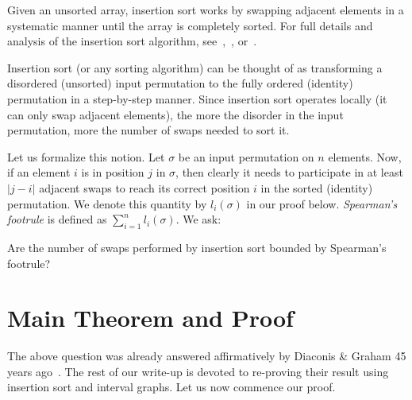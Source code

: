 \documentclass[12pt]{article}
\begin{document}
	Given an unsorted array, insertion sort works by swapping adjacent elements in a systematic manner until the array is completely sorted. For full details and analysis of the insertion sort algorithm, see~\cite[Page 80]{knuth1998},~\cite[Page 16]{cormen2022}, or~\cite{enwiki:ainsertionsort}.
	
	Insertion sort (or any sorting algorithm) can be thought of as transforming a disordered (unsorted) input permutation to the fully ordered (identity) permutation in a step-by-step manner. Since insertion sort operates locally (it can only swap adjacent elements), the more the disorder in the input permutation, more the number of swaps needed to sort it.
	
	Let us formalize this notion. Let $\sigma$ be an input permutation on $n$ elements. Now, if an element $i$ is in position $j$ in $\sigma$, then clearly it needs to participate in at least $|j-i|$ adjacent swaps to reach its correct position $i$ in the sorted (identity) permutation. We denote this quantity by $l_i(\sigma)$ in our proof below. \emph{Spearman's footrule} is defined as $\sum_{i=1}^n l_i(\sigma)$. We ask: %
	
	
	\vspace{0.3cm}
	\begin{mdframed}[backgroundcolor=blue!5]
	\begin{itshape} Are the number of swaps performed by insertion sort bounded by Spearman's footrule?
	\end{itshape}
	\end{mdframed}
	
	\section{Main Theorem and Proof}
	
	The above question was already answered affirmatively by Diaconis \& Graham 45 years ago~\cite{diaconisgraham1977}. The rest of our write-up is devoted to re-proving their result using insertion sort and interval graphs. Let us now commence our proof.
    
    
\end{document}
